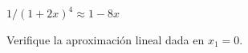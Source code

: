 \item $\displaystyle 1/(1 + 2x)^4 \approx 1 - 8x$
\par
Verifique la aproximación lineal dada en $x_1 = 0$.
